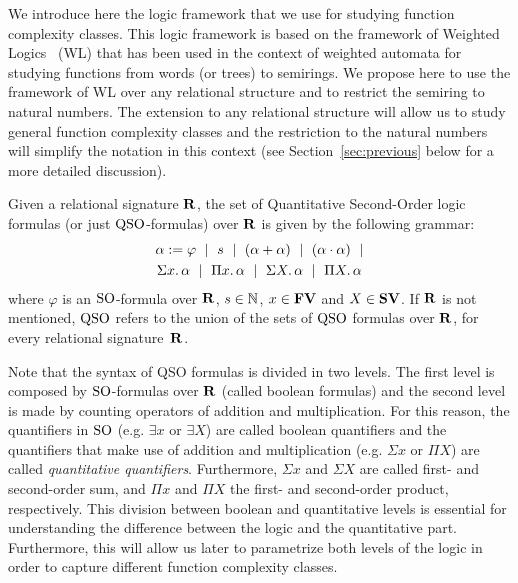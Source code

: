 
We introduce here the logic framework that we use for studying function complexity classes. 
This logic framework is based on the framework of Weighted Logics~\cite{DrosteG07} (WL) that has been used in the context of weighted automata for studying functions from words (or trees) to semirings. 
We propose here to use the framework of WL over any relational structure and to restrict the semiring to natural numbers. 
The extension to any relational structure will allow us to study general function complexity classes and the restriction to the natural numbers will simplify the notation in this context (see Section~\ref{sec:previous} below for a more detailed discussion).

Given a relational signature $\mathbf{R}$, the set of Quantitative Second-Order logic formulas (or just ${\rm QSO}$-formulas) over $\mathbf{R}$ is given by the following grammar:
\begin{multline*}
\alpha := \varphi \ \mid \ s \ \mid \ (\alpha \add \alpha) \ \mid\ (\alpha \mult \alpha) \ \mid \\ \sa{x} \alpha \ \mid \ \pa{x} \alpha \ \mid \ \sa{X} \alpha \ \mid \ \pa{X} \alpha 
\end{multline*}
where $\varphi$ is an ${\rm SO}$-formula over $\mathbf{R}$, $s \in \mathbb{N}$, $x \in \mathbf{FV}$ and $X \in \mathbf{SV}$. If $\mathbf{R}$ is not mentioned, ${\rm QSO}$ refers to the union of the sets of ${\rm QSO}$ formulas over $\mathbf{R}$, for every relational signature~$\mathbf{R}$.
 
Note that the syntax of QSO formulas is divided in two levels. 
The first level is composed by ${\rm SO}$-formulas over $\mathbf{R}$ (called boolean formulas) and the second level is made by counting operators of addition and multiplication. 
For this reason, the quantifiers in ${\rm SO}$ (e.g. $\exists x$ or $\exists X$) are called boolean quantifiers and the quantifiers that make use of addition and multiplication (e.g. $\Sigma x$ or $\Pi X$) are called {\em quantitative quantifiers}.
Furthermore, $\Sigma x$ and $\Sigma X$ are called first- and second-order sum, and $\Pi x$ and $\Pi X$ the first- and second-order product, respectively.
This division between boolean and quantitative levels is essential for understanding the difference between the logic and the quantitative part. 
Furthermore, this will allow us later to parametrize both levels of the logic in order to capture different function complexity classes.

